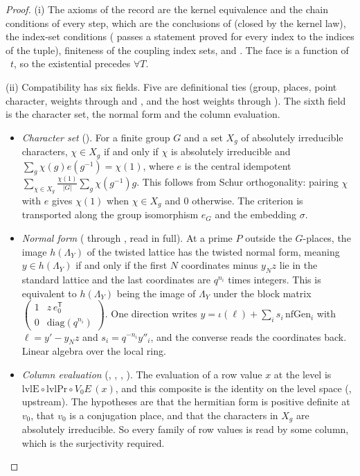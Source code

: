 \documentclass[11pt]{article}
\theoremstyle{remark}
\begin{document}
\begin{proof}
(i) The axioms of the record are the kernel equivalence and the chain conditions of every step, which are the conclusions of  (closed by the kernel law), the index-set conditions  ( passes a statement proved for every index to the indices of the tuple), finiteness of the coupling index sets, and . The face is a function of ~$t$, so the existential precedes $\forall T$.

(ii) Compatibility has six fields. Five are definitional ties (group, places, point character, weights through  and , and the host weights through ). The sixth field is the character set, the normal form and the column evaluation.
\begin{itemize}[leftmargin=*,itemsep=1pt]
\item \emph{Character set} (). For a finite group $G$ and a set $X_g$ of absolutely irreducible characters, $\chi\in X_g$ if and only if $\chi$ is absolutely irreducible and $\sum_g\chi(g)e(g^{-1})=\chi(1)$, where $e$ is the central idempotent $\sum_{\chi\in X_g}\frac{\chi(1)}{\lvert G\rvert}\sum_g\chi(g^{-1})g$. This follows from Schur orthogonality: pairing $\chi$ with $e$ gives $\chi(1)$ when $\chi\in X_g$ and $0$ otherwise. The criterion is transported along the group isomorphism $e_G$ and the embedding $\sigma$.
\item \emph{Normal form} ( through , read in full). At a prime $P$ outside the $G$-places, the image $h(\Lambda_Y)$ of the twisted lattice has the twisted normal form, meaning $y\in h(\Lambda_Y)$ if and only if the first $N$ coordinates minus $y_N z$ lie in the standard lattice and the last coordinates are $q^{n_i}$ times integers. This is equivalent to $h(\Lambda_Y)$ being the image of $\Lambda_Y$ under the block matrix $\begin{pmatrix}1&z\,e_0^{\mathsf T}\\0&\mathrm{diag}(q^{n_i})\end{pmatrix}$. One direction writes $y=\iota(\ell)+\sum_is_i\,\mathrm{nfGen}_i$ with $\ell=y'-y_Nz$ and $s_i=q^{-n_i}y''_i$, and the converse reads the coordinates back. Linear algebra over the local ring.
\item \emph{Column evaluation} (, , , ). The evaluation of a row value $x$ at the level is $\mathrm{lvlE}\circ\mathrm{lvlPr}\circ V_0E\,(x)$, and this composite is the identity on the level space (, upstream). The hypotheses are that the hermitian form is positive definite at $v_0$, that $v_0$ is a conjugation place, and that the characters in $X_g$ are absolutely irreducible. So every family of row values is read by some column, which is the surjectivity required.

\end{itemize}
\end{proof}
\end{document}
